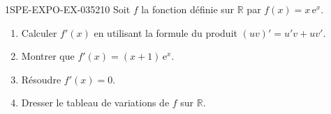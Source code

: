 \begin{exercice}{1SPE-EXPO-EX-035}{2}{10}
Soit $f$ la fonction définie sur $\mathbb{R}$ par $f(x) = x\,\mathrm{e}^{x}$.
\begin{enumerate}
\item Calculer $f'(x)$ en utilisant la formule du produit $(uv)' = u'v + uv'$.
\item Montrer que $f'(x) = (x+1)\,\mathrm{e}^{x}$.
\item Résoudre $f'(x) = 0$.
\item Dresser le tableau de variations de $f$ sur $\mathbb{R}$.
\end{enumerate}
\end{exercice}
